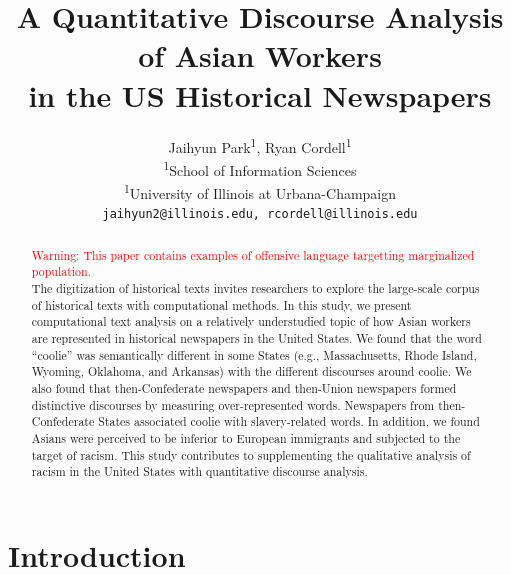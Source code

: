\documentclass[11pt]{article}
\title{A Quantitative Discourse Analysis of Asian Workers \\ in the US Historical Newspapers}
\author{Jaihyun Park\textsuperscript{1}, Ryan Cordell\textsuperscript{1}\\
  \textsuperscript{1}School of Information Sciences\\
  \textsuperscript{1}University of Illinois at Urbana-Champaign\\
  \texttt{jaihyun2@illinois.edu, rcordell@illinois.edu}}
\begin{document}
\maketitle
\begin{abstract}
\textcolor{red}{Warning: This paper contains examples of offensive language targetting marginalized population.}
\\
The digitization of historical texts invites researchers 
to explore the large-scale corpus of historical texts with computational methods.
In this study, we present computational text analysis on a relatively understudied topic of
how Asian workers are represented in historical newspapers in the United States. We found that the word ``coolie'' 
was semantically different in some States (e.g., Massachusetts, Rhode Island, Wyoming, Oklahoma, and Arkansas)
with the different discourses around coolie. We also found that then-Confederate newspapers and then-Union newspapers
formed distinctive discourses by measuring over-represented words. Newspapers from then-Confederate States
associated coolie with slavery-related words. In addition, we found Asians were perceived to be 
inferior to European immigrants and subjected to the target of racism. This study contributes to supplementing
the qualitative analysis of racism in the United States with quantitative discourse analysis.  


\end{abstract}

\section{Introduction} \label{sec:intro}
\end{document}
